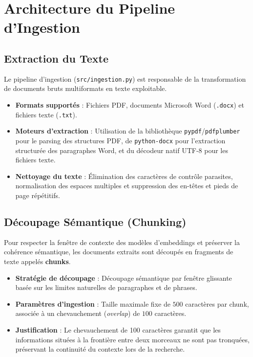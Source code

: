 \section{Architecture du Pipeline d'Ingestion}

\subsection{Extraction du Texte}
Le pipeline d'ingestion (\texttt{src/ingestion.py}) est responsable de la transformation de documents bruts multiformats en texte exploitable.
\begin{itemize}
    \item \textbf{Formats supportés} : Fichiers PDF, documents Microsoft Word (\texttt{.docx}) et fichiers texte (\texttt{.txt}).
    \item \textbf{Moteurs d'extraction} : Utilisation de la bibliothèque \texttt{pypdf}/\texttt{pdfplumber} pour le parsing des structures PDF, de \texttt{python-docx} pour l'extraction structurée des paragraphes Word, et du décodeur natif UTF-8 pour les fichiers texte.
    \item \textbf{Nettoyage du texte} : Élimination des caractères de contrôle parasites, normalisation des espaces multiples et suppression des en-têtes et pieds de page répétitifs.
\end{itemize}

\subsection{Découpage Sémantique (Chunking)}
Pour respecter la fenêtre de contexte des modèles d'embeddings et préserver la cohérence sémantique, les documents extraits sont découpés en fragments de texte appelés \textbf{chunks}.
\begin{itemize}
    \item \textbf{Stratégie de découpage} : Découpage sémantique par fenêtre glissante basée sur les limites naturelles de paragraphes et de phrases.
    \item \textbf{Paramètres d'ingestion} : Taille maximale fixe de $500$ caractères par chunk, associée à un chevauchement (\textit{overlap}) de $100$ caractères.
    \item \textbf{Justification} : Le chevauchement de 100 caractères garantit que les informations situées à la frontière entre deux morceaux ne sont pas tronquées, préservant la continuité du contexte lors de la recherche.
\end{itemize}

